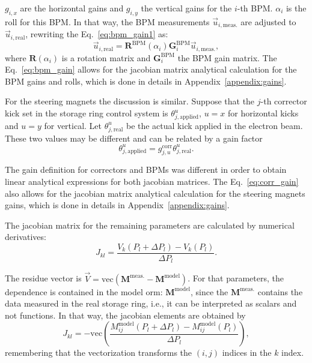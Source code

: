 $g_{i, x}$ are the horizontal gains and $g_{i, y}$ the vertical gains for the $i$-th BPM. $\alpha_i$ is the roll for this BPM. In that way, the BPM measurements $\vec{u}_{i, \mathrm{meas.}}$ are adjusted to $\vec{u}_{i, \mathrm{real}}$, rewriting the Eq.~\eqref{eq:bpm_gain1} as:
\begin{equation}
    \vec{u}_{i, \mathrm{real}} = \mathbf{R}^{\mathrm{BPM}}\left(\alpha_i\right) \mathbf{G}_{i}^{\mathrm{BPM}} \vec{u}_{i, \mathrm{meas.}},
    \label{eq:bpm_gain}
\end{equation}
where $\mathbf{R}\left(\alpha_i\right)$ is a rotation matrix and $\mathbf{G}_{i}^{\mathrm{BPM}}$ the BPM gain matrix. The Eq.~\eqref{eq:bpm_gain} allows for the jacobian matrix analytical calculation for the BPM gains and rolls, which is done in details in Appendix~\ref{appendix:gains}.

For the steering magnets the discussion is similar. Suppose that the $j$-th corrector kick set in the storage ring control system is $\theta_{j, \mathrm{applied}}^u$, $u=x$ for horizontal kicks and $u=y$ for vertical. Let $\theta_{j, \mathrm{real}}^u$ be the actual kick applied in the electron beam. These two values may be different and can be related by a gain factor
\begin{equation}
    \theta_{j, \mathrm{applied}}^u = g_{j, u}^{\mathrm{corr}}\theta_{j, \mathrm{real}}^u.
    \label{eq:corr_gain}
\end{equation}

The gain definition for correctors and BPMs was different in order to obtain linear analytical expressions for both jacobian matrices. The Eq.~\eqref{eq:corr_gain} also allows for the jacobian matrix analytical calculation for the steering magnets gains, which is done in details in Appendix~\ref{appendix:gains}. 

The jacobian matrix for the remaining parameters are calculated by numerical derivatives:
\begin{equation}
    J_{kl} = \dfrac{V_{k}\left(P_{l} + \Delta P_{l}\right) - V_{k}\left(P_{l}\right)}{\Delta P_{l}}.
\end{equation}

The residue vector is $\vec{V} = \mathrm{vec}\left(\mathbf{M}^{\mathrm{meas.}} - \mathbf{M}^{\mathrm{model}}\right)$. For that parameters, the dependence is contained in the model \gls{orm}: $\mathbf{M}^{\mathrm{model}}$, since the $\mathbf{M}^{\mathrm{meas.}}$ contains the data measured in the real storage ring, i.e., it can be interpreted as scalars and not functions. In that way, the jacobian elements are obtained by
\begin{equation}
    J_{kl} = -\mathrm{vec}\left(\dfrac{M_{ij}^{\mathrm{model}}\left(P_{l} + \Delta P_{l}\right) - M_{ij}^{\mathrm{model}}\left(P_{l}\right)}{\Delta P_{l}}\right),
\end{equation}
remembering that the vectorization transforms the $(i, j)$ indices in the $k$ index.

